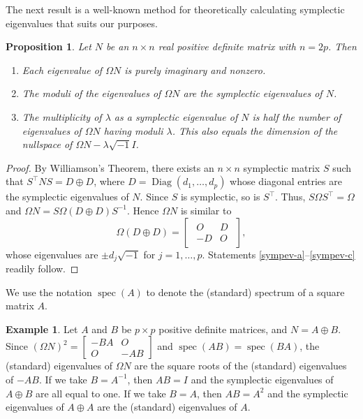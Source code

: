 \documentclass[12pt]{article}
\newtheorem{prop}[thm]{Proposition}
\theoremstyle{definition}
\theoremstyle{definition}
\theoremstyle{definition}
\newtheorem{ex}[thm]{Example}
\numberwithin{figure}{section}
\numberwithin{equation}{section}
\newcommand{\trans}{^{\top}}
\newcommand{\mtx}[1]{\begin{bmatrix} #1 \end{bmatrix}}
\newcommand{\spec}{\operatorname{spec}}
\newcommand{\diag}{\operatorname{Diag}}
\newcommand{\ben}{\begin{enumerate}}
\newcommand{\een}{\end{enumerate}}
\begin{document}
The next result is a well-known method for theoretically calculating symplectic eigenvalues that suits our purposes. 
\begin{prop}
\label{sympev}
Let $N$ be an $n\times n$ real positive definite matrix with $n=2p$.
Then 
\ben[$(a)$]
    \item 
    \label{sympev-a}
    Each eigenvalue of $\Omega N$ is purely imaginary and nonzero.
    \item
     \label{sympev-b}
    The moduli of the eigenvalues of $\Omega N$ are the symplectic eigenvalues of $N$.
    \item  
    \label{sympev-c}
    The multiplicity of $\lambda$ as a symplectic eigenvalue of $N$ is half the number 
     of eigenvalues of $\Omega N$ having moduli  $\lambda$. This also equals the dimension of the nullspace of 
     $\Omega N-\lambda \sqrt{-1} I$.
\een 
\end{prop}
\begin{proof}
By Williamson's Theorem, there exists an $n\times n$ symplectic matrix $S$
such that $S\trans N S= D \oplus D$, where $D=\diag(d_1, \ldots,d_p)$  whose diagonal entries are the 
symplectic eigenvalues of $N$. Since $S$ is symplectic, 
so is $S\trans$.  Thus, $S \Omega S\trans=\Omega$ and  $\Omega N= S\Omega(D\oplus D) S^{-1}$.  Hence $\Omega N$
is similar to 
\[ 
\Omega (D\oplus D)= \mtx {\begin{array}{rc} O & D \\  -D & O 
\end{array} },
\]
whose eigenvalues are $\pm d_j\sqrt{-1} $ for $j=1,\ldots, p$.
Statements \eqref{sympev-a}--\eqref{sympev-c} readily follow.  
\end{proof}

We use the notation $\spec(A)$ to denote the (standard) spectrum of a square matrix $A$.

 \begin{ex}
\label{ex:directsum}
Let $A$ and $B$ be $p\times p$ positive definite matrices, and 
$N=A\oplus B$.   
Since $(\Omega N)^2=\mtx{-BA & O\\O & -AB}$ and $\spec(AB)=\spec(BA)$, the 
(standard) eigenvalues of $\Omega N$ are the square roots of the (standard) eigenvalues of $-AB$.
If we take $B=A^{-1}$, then $AB=I$ and the symplectic eigenvalues of $A \oplus B$ are all equal to one. If we take $B=A$, then $AB=A^2$ and the symplectic eigenvalues of $A \oplus A$ are the (standard) eigenvalues of $A$. 
\end{ex}
\end{document}

